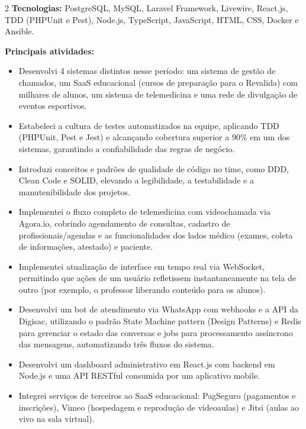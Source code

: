\documentclass[10pt]{article}
\begin{document}
\begin{paracol}{2}
\textbf{Tecnologias:} PostgreSQL, MySQL, Laravel Framework, Livewire, React.js, TDD (PHPUnit e Pest), Node.js, TypeScript, JavaScript, HTML, CSS, Docker e Ansible.\par\vspace{4pt}
\textbf{Principais atividades:}\vspace{2pt}
\begin{itemize}
  \item Desenvolvi 4 sistemas distintos nesse período: um sistema de gestão de chamados, um SaaS educacional (cursos de preparação para o Revalida) com milhares de alunos, um sistema de telemedicina e uma rede de divulgação de eventos esportivos.
  \item Estabeleci a cultura de testes automatizados na equipe, aplicando TDD (PHPUnit, Pest e Jest) e alcançando cobertura superior a 90\% em um dos sistemas, garantindo a confiabilidade das regras de negócio.
  \item Introduzi conceitos e padrões de qualidade de código no time, como DDD, Clean Code e SOLID, elevando a legibilidade, a testabilidade e a manutenibilidade dos projetos.
  \item Implementei o fluxo completo de telemedicina com videochamada via Agora.io, cobrindo agendamento de consultas, cadastro de profissionais/agendas e as funcionalidades dos lados médico (exames, coleta de informações, atestado) e paciente.
  \item Implementei atualização de interface em tempo real via WebSocket, permitindo que ações de um usuário refletissem instantaneamente na tela de outro (por exemplo, o professor liberando conteúdo para os alunos).
  \item Desenvolvi um bot de atendimento via WhatsApp com webhooks e a API da Digisac, utilizando o padrão State Machine pattern (Design Patterns) e Redis para gerenciar o estado das conversas e jobs para processamento assíncrono das mensagens, automatizando três fluxos do sistema.
  \item Desenvolvi um dashboard administrativo em React.js com backend em Node.js e uma API RESTful consumida por um aplicativo mobile.
  \item Integrei serviços de terceiros ao SaaS educacional: PagSeguro (pagamentos e inscrições), Vimeo (hospedagem e reprodução de videoaulas) e Jitsi (aulas ao vivo na sala virtual).
\end{itemize}


\end{paracol}
\end{document}
